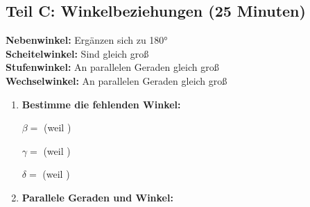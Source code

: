 \subsection*{Teil C: Winkelbeziehungen (25 Minuten)}

\begin{merkbox}
    \textbf{Nebenwinkel:} Ergänzen sich zu 180°\\
    \textbf{Scheitelwinkel:} Sind gleich groß\\
    \textbf{Stufenwinkel:} An parallelen Geraden gleich groß\\
    \textbf{Wechselwinkel:} An parallelen Geraden gleich groß
\end{merkbox}

\begin{enumerate}[label=\arabic*., resume]

    \item \textbf{Bestimme die fehlenden Winkel:}

    \vspace{0.5cm}

    \begin{center}
    \end{center}

    $\beta = $ \underline{\hspace{2cm}} (weil \underline{\hspace{4cm}})

    $\gamma = $ \underline{\hspace{2cm}} (weil \underline{\hspace{4cm}})

    $\delta = $ \underline{\hspace{2cm}} (weil \underline{\hspace{4cm}})

    \vspace{1cm}

    \item \textbf{Parallele Geraden und Winkel:}


\end{enumerate}
